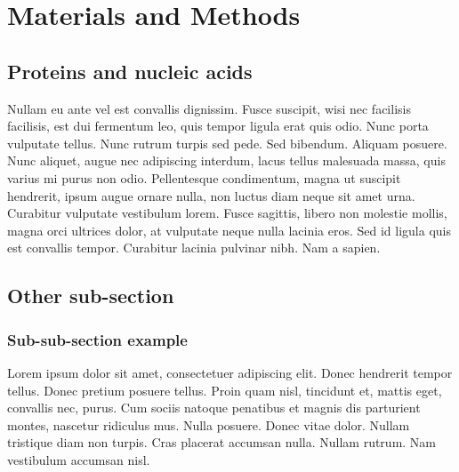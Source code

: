 \section*{Materials and Methods}
\subsection*{Proteins and nucleic acids} 
Nullam eu ante vel est convallis dignissim.  Fusce suscipit, wisi nec facilisis facilisis, est dui fermentum leo, quis tempor ligula erat quis odio.  Nunc porta vulputate tellus.  Nunc rutrum turpis sed pede.  Sed bibendum.  Aliquam posuere.  Nunc aliquet, augue nec adipiscing interdum, lacus tellus malesuada massa, quis varius mi purus non odio.  Pellentesque condimentum, magna ut suscipit hendrerit, ipsum augue ornare nulla, non luctus diam neque sit amet urna.  Curabitur vulputate vestibulum lorem.  Fusce sagittis, libero non molestie mollis, magna orci ultrices dolor, at vulputate neque nulla lacinia eros.  Sed id ligula quis est convallis tempor.  Curabitur lacinia pulvinar nibh.  Nam a sapien.


\subsection*{Other sub-section }
\subsubsection*{Sub-sub-section example}
Lorem ipsum dolor sit amet, consectetuer adipiscing elit.  Donec hendrerit tempor tellus.  Donec pretium posuere tellus.  Proin quam nisl, tincidunt et, mattis eget, convallis nec, purus.  Cum sociis natoque penatibus et magnis dis parturient montes, nascetur ridiculus mus.  Nulla posuere.  Donec vitae dolor.  Nullam tristique diam non turpis.  Cras placerat accumsan nulla.  Nullam rutrum.  Nam vestibulum accumsan nisl.


